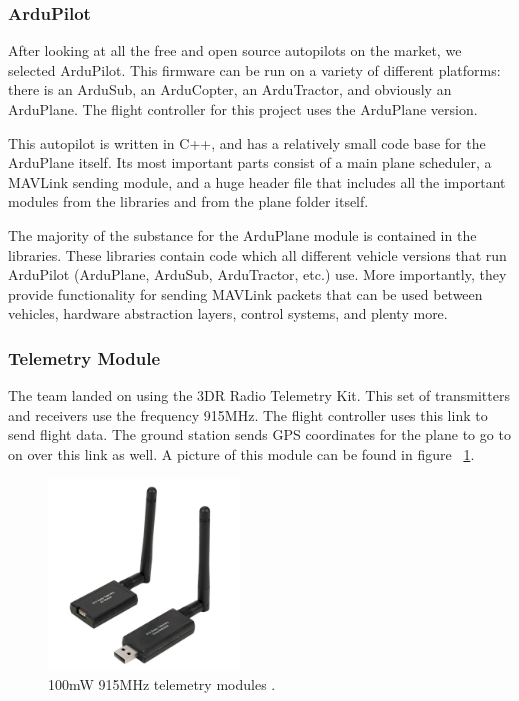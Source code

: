 \documentclass[12pt,journal,compsoc]{IEEEtran}
\begin{document}
\subsubsection{ArduPilot}
After looking at all the free and open source autopilots on the market, we selected ArduPilot. This firmware can be run on a variety of different platforms: there is an ArduSub, an ArduCopter, an ArduTractor, and obviously an ArduPlane. The flight controller for this project uses the ArduPlane version. 

This autopilot is written in C++, and has a relatively small code base for the ArduPlane itself. Its most important parts consist of a main plane scheduler, a MAVLink sending module, and a huge header file that includes all the important modules from the libraries and from the plane folder itself. 

The majority of the substance for the ArduPlane module is contained in the libraries. These libraries contain code which all different vehicle versions that run ArduPilot (ArduPlane, ArduSub, ArduTractor, etc.) use. More importantly, they provide functionality for sending MAVLink packets that can be used between vehicles, hardware abstraction layers, control systems, and plenty more. 

\subsubsection{Telemetry Module}
The team landed on using the 3DR Radio Telemetry Kit. This set of transmitters and receivers use the frequency 915MHz. The flight controller uses this link to send flight data. The ground station sends GPS coordinates for the plane to go to on over this link as well. A picture of this module can be found in figure ~\ref{mavStruct}.

\begin{figure}[h!]
\hspace*{0cm}
\centering
\includegraphics[width=2in]{telemmodule.jpg}

\caption{100mW 915MHz telemetry modules \cite{telemModule}.}

\label{mavStruct}
\end{figure}
\end{document}
